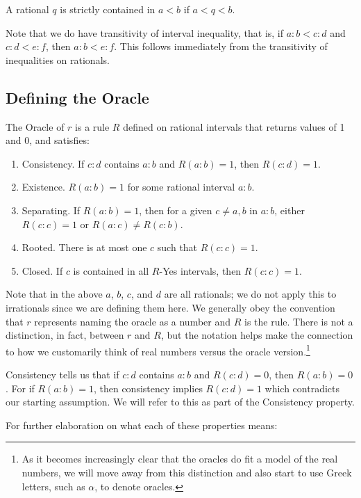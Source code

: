 \documentclass[12pt]{article}
\theoremstyle{remark}
\begin{document}
A rational $q$ is strictly contained in $a\lt b$ if $a < q < b$. 

Note that we do have transitivity of interval inequality, that is, if $a:b < c:d$ and $c:d < e:f$, then $a:b < e:f$. This follows immediately from the transitivity of inequalities on rationals.

\subsection{Defining the Oracle}

The Oracle of $r$ is a rule $R$ defined on rational intervals that returns values of 1 and 0, and satisfies: 
\begin{enumerate}
    \item Consistency. If $c:d$ contains $a:b$ and $R(a:b) = 1$, then $R(c:d) = 1$.
    \item Existence. $R(a:b) = 1$ for some rational interval $a:b$.
    \item Separating. If $R(a:b)=1$, then for a given $c \neq a, b$ in $a:b$, either $R(c:c) = 1$ or $R(a:c) \neq R(c:b)$. 
    \item Rooted. There is at most one $c$ such that $R(c:c) =1$.
    \item Closed. If $c$ is contained in all $R$-Yes intervals, then $R(c:c) = 1$.
\end{enumerate}

Note that in the above $a$, $b$, $c$, and $d$ are all rationals; we do not apply this to irrationals since we are defining them here. We generally obey the convention that $r$ represents naming the oracle as a number and $R$ is the rule. There is not a distinction, in fact, between $r$ and $R$, but the notation helps make the connection to how we customarily think of real numbers versus the oracle version.\footnote{As it becomes increasingly clear that the oracles do fit a model of the real numbers, we will move away from this distinction and also start to use Greek letters, such as $\alpha$, to denote oracles.}

Consistency tells us that if $c:d$ contains $a:b$ and $R(c:d) = 0$, then $R(a:b) = 0$. For if $R(a:b)=1$, then consistency implies $R(c:d)=1$ which contradicts our starting assumption. We will refer to this as part of the Consistency property. 

For further elaboration on what each of these properties means:
\end{document}

